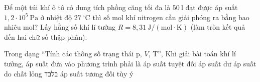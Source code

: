 \begin{ex}
Để một túi khí ô tô có dung tích phồng căng tối đa là $50\ \mathrm{l}$ đạt được áp suất $1,2 \cdot 10^5\ \mathrm{Pa}$ ở nhiệt độ $27\ ^\circ\mathrm{C}$ thì số mol khí nitrogen cần giải phóng ra bằng bao nhiêu mol? Lấy hằng số khí lí tưởng $R = 8,31\ \mathrm{J/(mol\cdot K)}$ (làm tròn kết quả đến hai chữ số thập phân).
\end{ex}

\begin{ex}
Trong dạng “Tính các thông số trạng thái p, $V$, T”, Khi giải bài toán khí lí tưởng, áp suất đưa vào phương trình phải là
\choice
{\True áp suất tuyệt đối}
{áp suất dư}
{áp suất do chất lỏng בלבד}
{áp suất tương đối tùy ý}
\end{ex}


